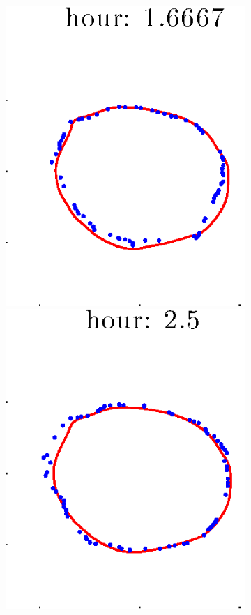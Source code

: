 \documentclass[12pt]{article}
\begin{document}
\begin{figure}[h!]
\begin{subfigure}[b]{.3\textwidth}
		\includegraphics[height=.15\textheight]{Pos10exp2/secondhalf/full3.eps}
		\includegraphics[height=.15\textheight]{Pos10exp2/secondhalf/full4.eps}

\end{subfigure}
\end{figure}
\end{document}

